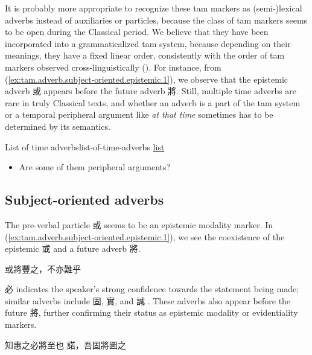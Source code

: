 \documentclass[UTF8, a4paper, oneside, scheme=plain, 12pt]{ctexrep}
\newcommand*{\citepages}[1]{pp.~{#1}}
\newcommand{\form}[1]{\emph{#1}}
\begin{document}
It is probably more appropriate to recognize these \ac{tam} markers as (semi-)lexical adverbs instead of auxiliaries or particles,
because the class of \ac{tam} markers seems to be open during the Classical period.
We believe that they have been incorporated into a grammaticalized \ac{tam} system,
because depending on their meanings, they have a fixed linear order,
consistently with the order of \ac{tam} markers observed cross-linguistically 
().
For instance, from (\ref{ex:tam.adverb.subject-oriented.epistemic.1}),
we observe that the epistemic adverb 或 appears before the future adverb 將.
Still, multiple time adverbs are rare in truly Classical texts,
and whether an adverb is a part of the \ac{tam} system or a temporal peripheral argument like \form{at that time} sometimes has to be determined by its semantics.


\begin{todobox}{List of time adverbs}{list-of-time-adverbs}
    \href{http://www.ziyexing.com/files-5/guhanyu/guhanyu_3_3.htm}{list}

    \begin{itemize}
        \item Are some of them peripheral arguments?
    \end{itemize}
\end{todobox}

\subsection{Subject-oriented adverbs}

The pre-verbal particle 或 seems to be an epistemic modality marker.
In (\ref{ex:tam.adverb.subject-oriented.epistemic.1}),
we see the coexistence of the epistemic 或 and a future adverb 將.

\begin{exe}
    \ex\label{ex:tam.adverb.subject-oriented.epistemic.1} 或將豐之，不亦難乎
\end{exe}

必 indicates the speaker's strong confidence towards the statement being made;
similar adverbs include 固, 實, and 誠
\citep[\citepages{376-377}]{li2004grammar}.
These adverbs also appear before the future 將,
further confirming their status as epistemic modality or evidentiality markers.

\begin{exe}
    \ex 知惠之必將至也
    \ex 諾，吾固將圖之
\end{exe}
\end{document}
